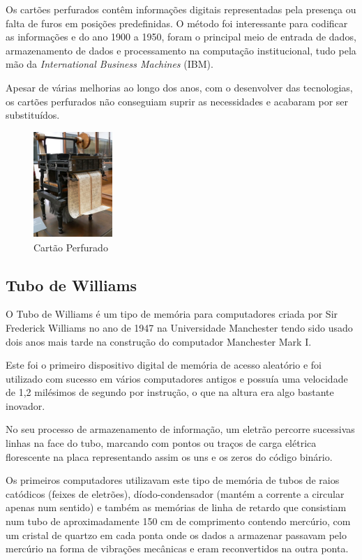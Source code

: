 \documentclass{report}
\begin{document}
		Os cartões perfurados contêm informações digitais representadas pela presença ou falta de furos em posições predefinidas. O método foi interessante para codificar as informações e do ano 1900 a 1950, foram o principal meio de entrada de dados, armazenamento de dados e processamento na computação institucional, tudo pela mão da \textit{International Business Machines} (IBM). 
		
		Apesar de várias melhorias ao longo dos anos, com o desenvolver das tecnologias, os cartões perfurados não conseguiam suprir as necessidades e acabaram por ser substituídos.
		
		\begin{figure}[h]
		\centering
		\includegraphics[width=3cm, height=4cm]{cartaoperfurado.jpg}
		\caption{Cartão Perfurado}
		\end{figure}
\newpage

		\subsection{Tubo de Williams}
		O Tubo de Williams é um tipo de memória para computadores criada por Sir Frederick Williams no ano de 1947 na Universidade Manchester tendo sido usado dois anos mais tarde na construção do computador Manchester Mark I.
	
	Este foi o primeiro dispositivo digital de memória de acesso aleatório e foi utilizado com sucesso em vários computadores antigos e possuía uma velocidade de 1,2 milésimos de segundo por instrução, o que na altura era algo bastante inovador.
	
	No seu processo de armazenamento de informação, um eletrão percorre sucessivas linhas na face do tubo, marcando com pontos ou traços de carga elétrica florescente na placa representando assim os uns e os zeros do código binário.
	
	Os primeiros computadores utilizavam este tipo de memória de tubos de raios catódicos (feixes de eletrões), díodo-condensador (mantém a corrente a circular apenas num sentido) e também as memórias de linha de retardo que consistiam num tubo de aproximadamente 150 cm de comprimento contendo mercúrio, com um cristal de quartzo em cada ponta onde os dados a armazenar passavam pelo mercúrio na forma de vibrações mecânicas e eram reconvertidos na outra ponta.
\\
\end{document}
